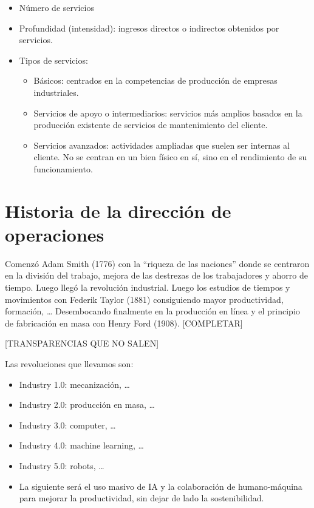\documentclass[12pt]{report} %
\providecommand{\tightlist}{%
  \setlength{\itemsep}{0pt}\setlength{\parskip}{0pt}}
\begin{document}
\begin{itemize}
\tightlist
\item
  Número de servicios\\
\item
  Profundidad (intensidad): ingresos directos o indirectos obtenidos por
  servicios.\\
\item
  Tipos de servicios:

  \begin{itemize}
  \tightlist
  \item
    Básicos: centrados en la competencias de producción de empresas
    industriales.\\
  \item
    Servicios de apoyo o intermediarios: servicios más amplios basados
    en la producción existente de servicios de mantenimiento del
    cliente.\\
  \item
    Servicios avanzados: actividades ampliadas que suelen ser internas
    al cliente. No se centran en un bien físico en sí, sino en el
    rendimiento de su funcionamiento.
  \end{itemize}
\end{itemize}

\hypertarget{historia-de-la-direcciuxf3n-de-operaciones}{%
\section{Historia de la dirección de
operaciones}\label{historia-de-la-direcciuxf3n-de-operaciones}}

Comenzó Adam Smith (1776) con la ``riqueza de las naciones'' donde se
centraron en la división del trabajo, mejora de las destrezas de los
trabajadores y ahorro de tiempo. Luego llegó la revolución industrial.
Luego los estudios de tiempos y movimientos con Federik Taylor (1881)
consiguiendo mayor productividad, formación, \ldots{} Desembocando
finalmente en la producción en línea y el principio de fabricación en
masa con Henry Ford (1908). {[}COMPLETAR{]}

{[}TRANSPARENCIAS QUE NO SALEN{]}

Las revoluciones que llevamos son:

\begin{itemize}
\tightlist
\item
  Industry 1.0: mecanización, \ldots{}\\
\item
  Industry 2.0: producción en masa, \ldots{}\\
\item
  Industry 3.0: computer, \ldots{}\\
\item
  Industry 4.0: machine learning, \ldots{}\\
\item
  Industry 5.0: robots, \ldots{}\\
\item
  La siguiente será el uso masivo de IA y la colaboración de
  humano-máquina para mejorar la productividad, sin dejar de lado la
  sostenibilidad.
\end{itemize}
\end{document}
